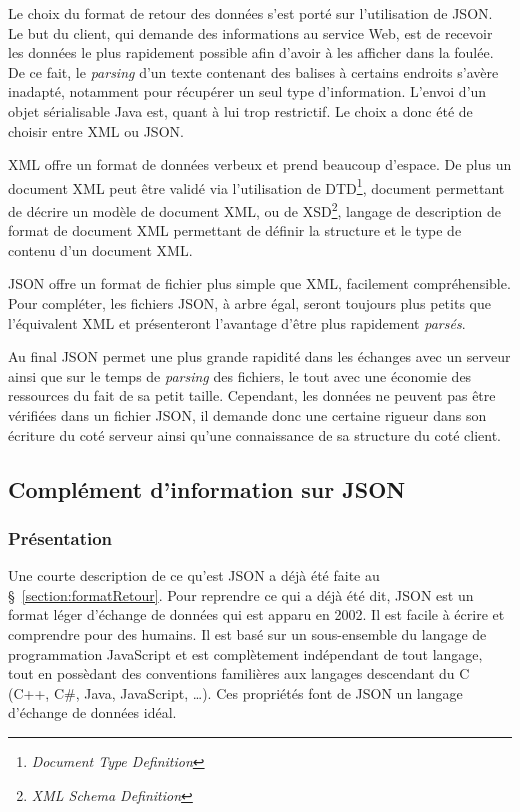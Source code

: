 Le choix du format de retour des donn\'ees s'est port\'e sur l'utilisation de JSON.
Le but du client, qui demande des informations au service Web, est de recevoir les donn\'ees le plus rapidement possible afin d'avoir \`a les afficher dans la foul\'ee.
De ce fait, le \textit{parsing} d'un texte contenant des balises \`a certains endroits s'av\`ere inadapt\'e, notamment pour r\'ecup\'erer un seul type d'information.
L'envoi d'un objet s\'erialisable Java est, quant \`a lui trop restrictif. Le choix a donc \'et\'e de choisir entre XML ou JSON.

XML offre un format de donn\'ees verbeux et prend beaucoup d'espace. 
De plus un document XML peut \^etre valid\'e via l'utilisation de DTD\protect\footnote{\textit{Document Type Definition}}, document permettant de d\'ecrire un mod\`ele de document XML, ou de XSD\protect\footnote{\textit{XML Schema Definition}}, langage de description de format de document XML permettant de d\'efinir la structure et le type de contenu d'un document XML.

JSON offre un format de fichier plus simple que XML, facilement compr\'ehensible.
Pour compl\'eter, les fichiers JSON, \`a arbre \'egal, seront toujours plus petits que l'\'equivalent XML et pr\'esenteront l'avantage d'\^etre plus rapidement \textit{pars\'es}.

Au final JSON permet une plus grande rapidit\'e dans les \'echanges avec un serveur ainsi que sur le temps de \textit{parsing} des fichiers, le tout avec une \'economie des ressources du fait de sa petit taille.
Cependant, les donn\'ees ne peuvent pas \^etre v\'erifi\'ees dans un fichier JSON, il demande donc une certaine rigueur dans son \'ecriture du cot\'e serveur ainsi qu'une connaissance de sa structure du cot\'e client.

\subsection{Compl\'ement d'information sur JSON}

\subsubsection{Pr\'esentation}

Une courte description de ce qu'est JSON a d\'ej\`a \'et\'e faite au \S~\ref{section:formatRetour}.
Pour reprendre ce qui a d\'ej\`a \'et\'e dit, JSON est un format l\'eger d'\'echange de donn\'ees qui est apparu en 2002.
Il est facile \`a \'ecrire et comprendre pour des humains.
Il est bas\'e sur un sous-ensemble du langage de programmation JavaScript et est compl\`etement ind\'ependant de tout langage, tout en poss\`edant des conventions famili\`eres aux langages descendant du C (C++, C\#, Java, JavaScript, \ldots).
Ces propri\'et\'es font de JSON un langage d'\'echange de donn\'ees id\'eal.

